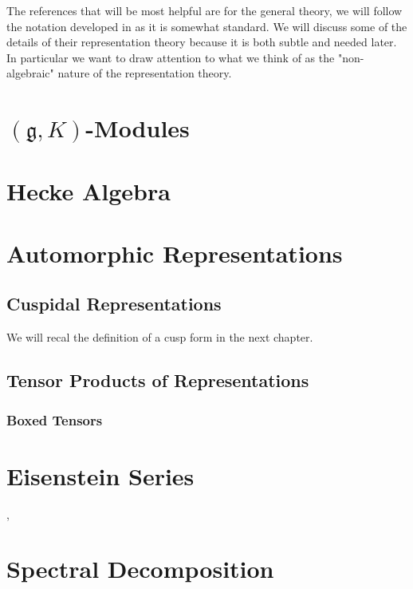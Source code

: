 The references that will be most helpful are \cite[I.II]{borelAutomorphicFormsRepresentations1979}\cite{getzIntroductionAutomorphicRepresentations2024} for the general theory, we will follow the notation developed in \cite{moeglinSpectralDecompositionEisenstein1995} as it is somewhat standard. We will discuss some of the details of their representation theory because it is both subtle and needed later. In particular we want to draw attention to what we think of as the "non-algebraic" nature of the representation theory.

\section{\((\mathfrak{g}, K)\)-Modules}

\section{Hecke Algebra}

\section{Automorphic Representations}

\subsection{Cuspidal Representations}
We will recal the definition of a cusp form  in the next chapter.

\subsection{Tensor Products of Representations}

\subsubsection{Boxed Tensors}

\section{Eisenstein Series}
\cite{lapidPerspectivesEisensteinSeries2022}, \cite{arthurEisensteinSeriesTrace1979}

\section{Spectral Decomposition}
